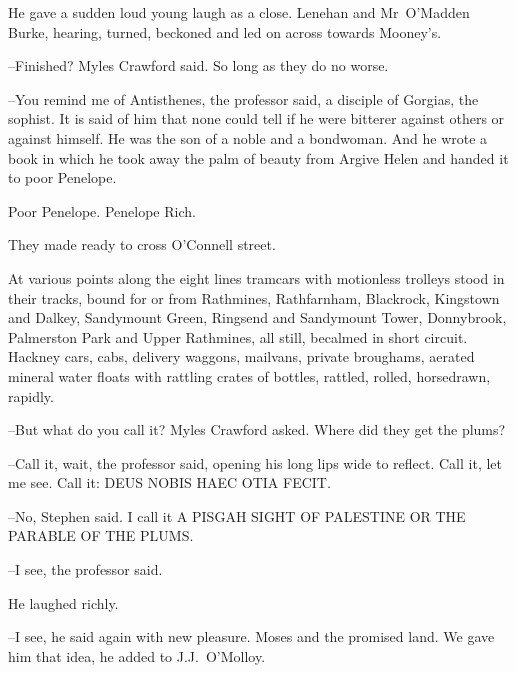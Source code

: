 He gave a sudden loud young laugh as a close.
Lenehan and Mr~O'Madden Burke,
hearing,
turned,
beckoned
and led on across towards Mooney's.

--Finished?
Myles Crawford said.
So long as they do no worse.



--You remind me of Antisthenes,
the professor said,
a disciple of Gorgias, the sophist.
It is said of him that none could tell
if he were bitterer against others or against himself.
He was the son of a noble and a bondwoman.
And he wrote a book
in which he took away the palm of beauty from Argive Helen
and handed it to poor Penelope.

Poor Penelope.
Penelope Rich.

They made ready to cross O'Connell street.



At various points along the eight lines
tramcars with motionless trolleys stood in their tracks,
bound for or from
Rathmines,
Rathfarnham,
Blackrock,
Kingstown and Dalkey,
Sandymount Green,
Ringsend and
Sandymount Tower,
Donnybrook,
Palmerston Park and Upper Rathmines,
all still,
becalmed in short circuit.
Hackney cars,
cabs,
delivery
waggons,
mailvans,
private broughams,
aerated mineral water floats with rattling crates of bottles,
rattled,
rolled,
horsedrawn,
rapidly.




--But what do you call it?
Myles Crawford asked.
Where did they get the plums?



--Call it, wait,
the professor said,
opening his long lips wide to
reflect.
Call it,
let me see.
Call it:
DEUS NOBIS HAEC OTIA FECIT.

--No,
Stephen said.
I call it
A PISGAH SIGHT OF PALESTINE
OR THE PARABLE OF THE PLUMS.

--I see,
the professor said.

He laughed richly.

--I see,
he said again with new pleasure.
Moses and the promised land.
We gave him that idea,
he added to J.J.~O'Molloy.


